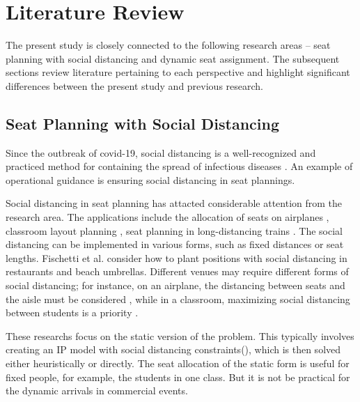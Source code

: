 \section{Literature Review}

The present study is closely connected to the following research areas -- seat planning with social distancing and dynamic seat assignment. The subsequent sections review literature pertaining to each perspective and highlight significant differences between the present study and previous research.


\subsection{Seat Planning with Social Distancing}
Since the outbreak of covid-19, social distancing is a well-recognized and practiced method for containing the spread of infectious diseases \cite{moosa2020effectiveness}. An example of operational guidance is ensuring social distancing in seat plannings.

Social distancing in seat planning has attacted considerable attention from the research area. The applications include the allocation of seats on airplanes \cite{ghorbani2020model}, classroom layout planning \cite{bortolete2022support}, seat planning in long-distancing trains \cite{haque2022optimization}. The social distancing can be implemented in various forms, such as fixed distances or seat lengths. Fischetti et al.\cite{fischetti2021safe} consider how to plant positions with social distancing in restaurants and beach umbrellas. Different venues may require different forms of social distancing; for instance, on an airplane, the distancing between seats and the aisle must be considered \cite{salari2022social}, while in a classroom, maximizing social distancing between students is a priority \cite{bortolete2022support}.

These researchs focus on the static version of the problem. This typically involves creating an IP model with social distancing constraints(\cite{bortolete2022support, ghorbani2020model, haque2022optimization}), which is then solved either heuristically or directly. The seat allocation of the static form is useful for fixed people, for example, the students in one class. But it is not be practical for the dynamic arrivals in commercial events.




